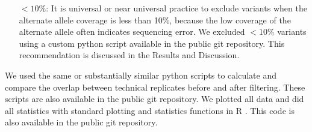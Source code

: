 \documentclass[11 pt]{article} %
\begin{document}
\begin{itemize}
\item[$<10\%$:] It is universal or near universal practice to exclude variants when the alternate allele coverage is less than 10\%, because the low coverage of the alternate allele often indicates sequencing error. We excluded $<10\%$ variants using a custom python script available in the public git repository. This recommendation is discussed in the Results and Discussion.
\end{itemize}

We used the same or substantially similar python scripts to calculate and compare the overlap between technical replicates before and after filtering. These scripts are also available in the public git repository. We plotted all data and did all statistics with standard plotting and statistics functions in R \citep{Rsoftware}. This code is also available in the public git repository.  


%
%
\end{document}

